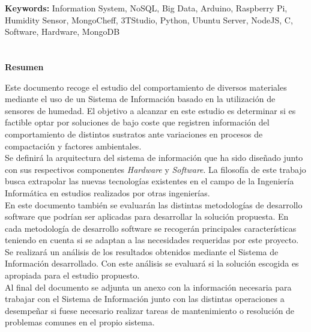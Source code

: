 
\newpage
\noindent
{\bf Keywords:\newline}
Information System, NoSQL, Big Data, Arduino, Raspberry Pi, Humidity Sensor, MongoCheff, 3TStudio, Python, Ubuntu Server, NodeJS, C, Software, Hardware, MongoDB

\thispagestyle{empty}
\newpage

\chapter*{}
\begin{center}
\textbf{Resumen}
\end{center}

Este documento recoge el estudio del comportamiento de diversos materiales mediante el uso de un Sistema de Información basado en la utilización de sensores de humedad. El objetivo a alcanzar en este estudio es determinar si es factible optar por soluciones de bajo coste que registren información del comportamiento de distintos sustratos ante variaciones en procesos de compactación y factores ambientales.\\

Se definirá la arquitectura del sistema de información que ha sido diseñado junto con sus respectivos componentes \textit{Hardware} y \textit{Software}. La filosofía de este trabajo busca extrapolar las nuevas tecnologías existentes en el campo de la Ingeniería Informática en estudios realizados por otras ingenierías.\\

En este documento también se evaluarán las distintas metodologías de desarrollo software que podrían ser aplicadas para desarrollar la solución propuesta. En cada metodología de desarrollo software se recogerán principales características teniendo en cuenta si se adaptan a las necesidades requeridas por este proyecto.\\

Se realizará un análisis de los resultados obtenidos mediante el Sistema de Información desarrollado. Con este análisis se evaluará si la solución escogida es apropiada para el estudio propuesto.\\

Al final del documento se adjunta un anexo con la información necesaria para trabajar con el Sistema de Información junto con las distintas operaciones a desempeñar si fuese necesario realizar tareas de mantenimiento o resolución de problemas comunes en el propio sistema.


\thispagestyle{empty}

\newpage
